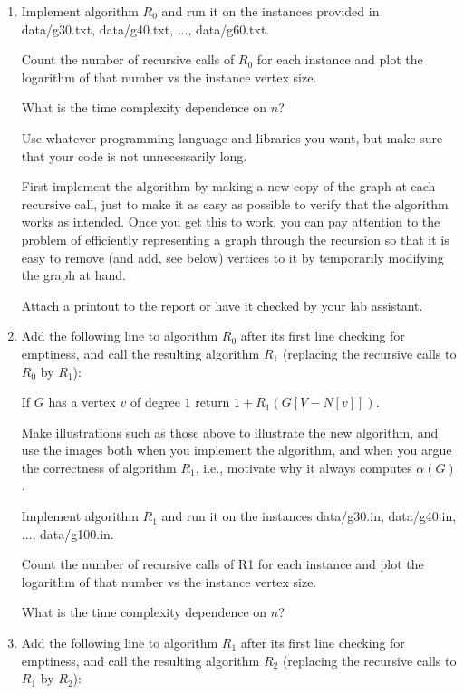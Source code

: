 \documentclass{tufte-handout}
\begin{document}
\begin{enumerate}
\item Implement algorithm $R_0$ and run it on the instances provided in
  data/g30.txt, data/g40.txt, ..., data/g60.txt.
  
  Count the number of recursive calls of $R_0$ for each instance and plot the
  logarithm of that number vs the instance vertex size. 
  
  What is the time complexity dependence on $n$?
  
  Use whatever programming language and libraries you want, but make
  sure that your code is not unnecessarily long.

  First implement the algorithm by making a new copy of the graph at
  each recursive call, just to make it as easy as possible to verify
  that the algorithm works as intended. Once you get this to work, you
  can pay attention to the problem of efficiently representing a graph
  through the recursion so that it is easy to remove (and add, see
  below) vertices to it by temporarily modifying the graph at hand.
   
  Attach a printout to the report or have it checked by your lab
  assistant.

\item Add the following line to algorithm $R_0$ after its first line
 checking for emptiness, and call the resulting algorithm $R_1$
 (replacing the recursive calls to $R_0$ by $R_1$):
 
 If $G$ has a vertex $v$ of degree $1$ return $1+R_1(G[V-N[v]])$.
 
 Make illustrations such as those above to illustrate the new
 algorithm, and use the images both when you implement the algorithm,
 and when you argue the correctness of algorithm $R_1$, i.e., motivate
 why it always computes $\alpha(G)$.
 
 Implement algorithm $R_1$ and run it on the instances data/g30.in,
 data/g40.in, $\ldots$, data/g100.in.

  Count the number of recursive calls of R1 for each instance and plot the
  logarithm of that number vs the instance vertex size. 
  
  What is the time complexity dependence on $n$?

\item Add the following line to algorithm $R_1$ after its first line
  checking for emptiness, and call the resulting algorithm $R_2$
  (replacing the recursive calls to $R_1$ by $R_2$):
 

\end{enumerate}
\end{document}
